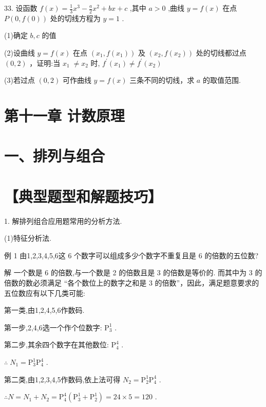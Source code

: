 \documentclass[10pt]{article}
\begin{document}
33. 设函数 \(f\left( x\right)  = \frac{1}{3}{x}^{3} - \frac{a}{2}{x}^{2} + {bx} + c\) ,其中 \(a > 0\) ,曲线 \(y = f\left( x\right)\) 在点 \(P\left( {0,f\left( 0\right) }\right)\) 处的切线方程为 \(y = 1\) .

(1)确定 \(b,c\) 的值

(2)设曲线 \(y = f\left( x\right)\) 在点 \(\left( {{x}_{1},f\left( {x}_{1}\right) }\right)\) 及 \(\left( {{x}_{2},f\left( {x}_{2}\right) }\right)\) 处的切线都过点 \(\left( {0,2}\right)\) ，证明:当 \({x}_{1} \; \neq  {x}_{2}\) 时, \({f}^{\prime }\left( {x}_{1}\right)  \neq  {f}^{\prime }\left( {x}_{2}\right)\)

(3)若过点 \(\left( {0,2}\right)\) 可作曲线 \(y = f\left( x\right)\) 三条不同的切线，求 \(a\) 的取值范围.

\section*{第十一章 计数原理}

\section*{一、排列与组合}

\section*{【典型题型和解题技巧】}

1. 解排列组合应用题常用的分析方法.

(1)特征分析法.

例 1 由1,2,3,4,5,6这 6 个数字可以组成多少个数字不重复且是 6 的倍数的五位数?

解 一个数是 6 的倍数,与一个数是 2 的倍数且是 3 的倍数是等价的. 而其中为 3 的倍数的数必须满足 “各个数位上的数字之和是 3 的倍数”，因此，满足题意要求的五位数应有以下几类可能:

第一类,由1,2,4,5,6作数码.

第一步,2,4,6选一个作个位数字: \({\mathrm{P}}_{3}^{1}\) .

第二步,其余四个数字在其他数位: \({\mathrm{P}}_{4}^{4}\) .

\(\therefore \;{N}_{1} = {\mathrm{P}}_{3}^{1}{\mathrm{P}}_{4}^{4}\) .

第二类,由1,2,3,4,5作数码,依上法可得 \({N}_{2} = {\mathrm{P}}_{2}^{1}{\mathrm{P}}_{4}^{4}\) .

\(\therefore N = {N}_{1} + {N}_{2} = {\mathrm{P}}_{4}^{4}\left( {{\mathrm{P}}_{3}^{1} + {\mathrm{P}}_{2}^{1}}\right)  = {24} \times  5 = {120}\) .
\end{document}
